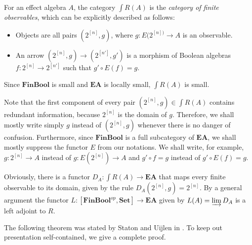 \documentclass[smallextended]{svjour3}
\begin{document}
For an effect algebra $A$, the category ${\int R({A})}$ is the {\em category of finite observables},
which can be explicitly described as follows:
\begin{itemize}
\item Objects are all pairs $(2^{[n]},g)$, where $g:E(2^{[n])}\to A$ is an observable.
\item An arrow $(2^{[n]},g)\to (2^{[n']},g')$ is a morphism of Boolean algebras $f:2^{[n]}\to 2^{[n']}$
such that $g'\circ E(f)=g$.
\end{itemize}
Since ${\mathbf{FinBool}}$ is small and ${\mathbf{EA}}$ is locally small, ${\int R({A})}$ is small.

Note that the first component of every pair $(2^{[n]},g)\in{\int R({A})}$ contains 
redundant information, because $2^{[n]}$ is the domain of $g$.
Therefore, we shall mostly write simply $g$ instead of $(2^{[n]},g)$ whenever
there is no danger of confusion.
Furthermore, since ${\mathbf{FinBool}}$ is a full subcategory of ${\mathbf{EA}}$, we shall mostly 
suppress the functor $E$ from our notations. We shall write, for example, 
$g:2^{[n]}\to A$ instead of $g:E(2^{[n]})\to A$ and $g'\circ f=g$ instead of
$g'\circ E(f)=g$.

Obviously, there is a functor $D_A:{\int R({A})}\to{\mathbf{EA}}$ that maps every finite observable to its domain, 
given by the rule $D_A(2^{[n]},g)=2^{[n]}$. By a general argument 
\cite[Theorem I.6.2]{maclane2012sheaves} the functor
$L:[{\mathbf{FinBool}}^{op},{\mathbf{Set}}]\to{\mathbf{EA}}$ given by $L(A)=\varinjlim D_A$ is a left adjoint to
$R$.

The following theorem was stated by Staton and Uijlen in \cite{staton2015effect}.
To keep out presentation self-contained, we give a complete proof.
\end{document}
